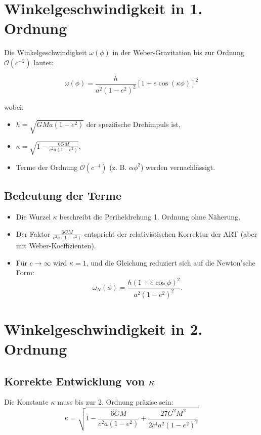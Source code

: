 \newpage
\section{Winkelgeschwindigkeit in 1. Ordnung}
Die Winkelgeschwindigkeit \(\omega(\phi)\) in der Weber-Gravitation bis zur Ordnung \(\mathcal{O}(c^{-2})\) lautet:

\begin{equation}
\omega(\phi) = \frac{h}{a^2(1 - e^2)^2} \left[1 + e \cos\left(\kappa\phi\right)\right]^2
\end{equation}

wobei:
\begin{itemize}
    \item \(h = \sqrt{GMa(1 - e^2)}\) der spezifische Drehimpuls ist,
    \item \(\kappa = \sqrt{1 - \frac{6GM}{c^2a(1 - e^2)}}\),
    \item Terme der Ordnung \(\mathcal{O}(c^{-4})\) (z. B. \(\alpha\phi^2\)) werden vernachlässigt.
\end{itemize}

\subsection*{Bedeutung der Terme}
\begin{itemize}
    \item Die Wurzel \(\kappa\) beschreibt die Periheldrehung 1. Ordnung ohne Näherung.
    \item Der Faktor \(\frac{6GM}{c^2a(1 - e^2)}\) entspricht der relativistischen Korrektur der ART (aber mit Weber-Koeffizienten).
    \item Für \(c \to \infty\) wird \(\kappa = 1\), und die Gleichung reduziert sich auf die Newton’sche Form:
    \[
    \omega_N(\phi) = \frac{h(1 + e \cos\phi)^2}{a^2(1 - e^2)^2}.
    \]
\end{itemize}

\section{Winkelgeschwindigkeit in 2. Ordnung}

\subsection{Korrekte Entwicklung von \(\kappa\)}
Die Konstante \(\kappa\) muss bis zur 2. Ordnung präzise sein:
\begin{equation}
\kappa = \sqrt{1 - \frac{6GM}{c^2a(1-e^2)} + \frac{27G^2M^2}{2c^4a^2(1-e^2)^2}}
\end{equation}

